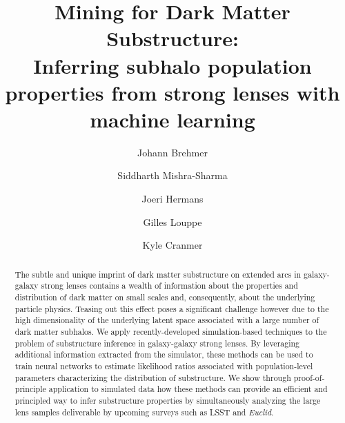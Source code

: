 \documentclass[twocolumn]{aastex62}
\begin{document}
\sloppy\sloppypar\raggedbottom\frenchspacing

\title{\textbf{%
Mining for Dark Matter Substructure: \\
Inferring subhalo population properties from strong lenses with machine learning
}}

\author{Johann Brehmer}

\author{Siddharth Mishra-Sharma}

\author{Joeri Hermans}

\author{Gilles Louppe}

\author{Kyle Cranmer}

\begin{abstract}\noindent
The subtle and unique imprint of dark matter substructure on extended arcs in galaxy-galaxy strong lenses contains a wealth of information about the properties and distribution of dark matter on small scales and, consequently, about the underlying particle physics. Teasing out this effect poses a significant challenge however due to the high dimensionality of the underlying latent space associated with a large number of dark matter subhalos. We apply recently-developed simulation-based techniques to the problem of substructure inference in galaxy-galaxy strong lenses. By leveraging additional information extracted from the simulator, these methods can be used to train neural networks to estimate likelihood ratios associated with population-level parameters characterizing the distribution of substructure. We show through proof-of-principle application to simulated data how these methods can provide an efficient and principled way to infer substructure properties by simultaneously analyzing the large lens samples deliverable by upcoming surveys such as LSST and \emph{Euclid}.
\end{abstract}

\end{document}
